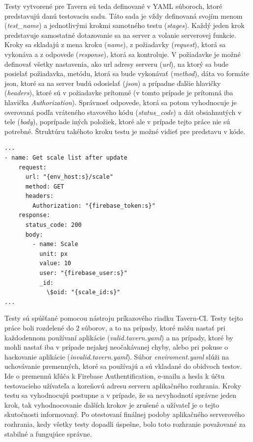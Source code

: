 Testy vytvorené pre Tavern sú teda definované v YAML súboroch, ktoré predstavujú danú testovaciu sadu. Táto sada je vždy definovaná svojím menom (\textit{test\_name}) a jednotlivými krokmi samotného testu (\textit{stages}).  Každý jeden krok predstavuje samostatné dotazovanie sa na server a volanie serverovej funkcie. Kroky sa skladajú z mena kroku (\textit{name}), z požiadavky (\textit{request}), ktorá sa vykonáva a z odpovede (\textit{response}), ktorá sa kontroluje. V požiadavke je možné definovať všetky nastavenia, ako url adresy serveru (\textit{url}), na ktorý sa bude posielať požiadavka, metódu, ktorá sa bude vykonávať (\textit{method}), dáta vo formáte json, ktoré sa na server budú odosielať (\textit{json}) a prípadne ďalšie hlavičky (\textit{headers}), ktoré sú v požiadavke prítomné (v tomto prípade je prítomná iba hlavička \textit{Authorization}). Správnosť odpovede, ktorá sa potom vyhodnocuje je overovaná podľa vráteného stavového kódu (\textit{status\_code}) a dát obsiahnutých v tele (\textit{body}), poprípade iných položiek, ktoré ale v prípade tejto práce nie sú potrebné. Štruktúru takéhoto kroku testu je možné vidieť pre predstavu v kóde. 
\begin{lstlisting}[caption={Ukážka testovacieho kroku.},captionpos=b]
...
- name: Get scale list after update
    request:
      url: "{env_host:s}/scale"
      method: GET
      headers:
        Authorization: "{firebase_token:s}"
    response:
      status_code: 200
      body:
        - name: Scale
          unit: px
          value: 10
          user: "{firebase_user:s}"
          _id:
            \$oid: "{scale_id:s}"
...
\end{lstlisting}
Testy sú spúšťané pomocou nástroju príkazového riadku Tavern-CI. Testy tejto práce boli rozdelené do 2 súborov, a to na prípady, ktoré môžu nastať pri každodennom používaní aplikácie (\textit{valid.tavern.yaml}) a na prípady, ktoré by mohli nastať iba v prípade nejakej neočakávanej chyby, alebo pri pokuse o hackovanie aplikácie (\textit{invalid.tavern.yaml}). Súbor \textit{enviroment.yaml} slúži na uchovávanie premenných, ktoré sa používajú a sú vkladané do obidvoch testov. Ide o premennú kľúča k Firebase Authentification, e-mailu a hesla k účtu testovacieho užívateľa a koreňovú adresu serveru aplikačného rozhrania. Kroky testu sa vyhodnocujú postupne a v prípade, že sa nevyhodnotí správne jeden krok, tak vyhodnocovanie ďalších krokov je zrušené a užívateľ je o tejto skutočnosti informovaný. Po otestovaní finálnej podoby aplikačného serverového rozhrania, kedy všetky testy dopadli úspešne, bolo toto rozhranie považované za stabilné a fungujúce správne. 


